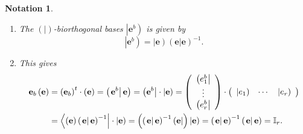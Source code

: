 \documentclass[aps,preprint]{revtex4}%
\newtheorem{notation}[theorem]{Notation}
\begin{document}
\begin{notation}
\begin{enumerate}
\begin{enumerate}
\item The $\left(  \left.  {}\right\vert \right)  $-biorthogonal bases
$\left\vert \mathbf{e}^{b}\right)  $ is given by
\begin{equation}
\left\vert \mathbf{e}^{b}\right)  =\left\vert \mathbf{e}\right)  \left(
\left.  \mathbf{e}\right\vert \mathbf{e}\right)  ^{-1}.
\end{equation}


\item This gives%
\begin{align}
\mathbf{e}_{b}\left(  \mathbf{e}\right)   &  =\left(  \mathbf{e}_{b}\right)
^{t}\cdot\left(  \mathbf{e}\right)  =\left(  \left.  \mathbf{e}^{b}\right\vert
\mathbf{e}\right)  =\left(  \mathbf{e}^{b}\right\vert \cdot\left\vert
\mathbf{e}\right)  =\left(
\begin{array}
[c]{c}%
\left(  e_{1}^{b}\right\vert \\
\vdots\\
\left(  e_{r}^{b}\right\vert
\end{array}
\right)  \cdot\left(
\begin{array}
[c]{ccc}%
\left\vert e_{1}\right)  & \cdots & \left\vert e_{r}\right)
\end{array}
\right) \\
&  =\left\langle \left(  \mathbf{e}\right)  \left(  \left.  \mathbf{e}%
\right\vert \mathbf{e}\right)  ^{-1}\right\vert \cdot\left\vert \mathbf{e}%
\right)  =\left(  \left(  \left.  \mathbf{e}\right\vert \mathbf{e}\right)
^{-1}\left(  \mathbf{e}\right\vert \right)  \left\vert \mathbf{e}\right)
=\left(  \left.  \mathbf{e}\right\vert \mathbf{e}\right)  ^{-1}\left(  \left.
\mathbf{e}\right\vert \mathbf{e}\right)  =\mathbb{I}_{r}.
\end{align}

\end{enumerate}
\end{enumerate}
\end{notation}
\end{document}
